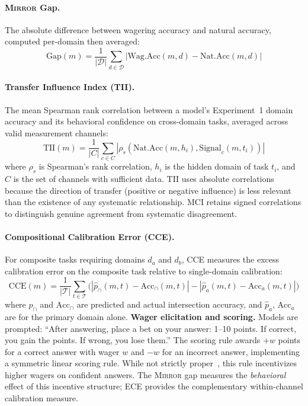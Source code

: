 \documentclass[10pt]{article}
\newcommand{\mirror}{\textsc{Mirror}}
\newcommand{\CCE}{CCE}
\newcommand{\TII}{TII}
\begin{document}
\paragraph{\mirror{} Gap.}
The absolute difference between wagering accuracy and natural accuracy, computed per-domain then averaged:
\begin{equation}
\text{Gap}(m) = \frac{1}{|\mathcal{D}|} \sum_{d \in \mathcal{D}} |\text{Wag.Acc}(m, d) - \text{Nat.Acc}(m, d)|
\end{equation}

\paragraph{Transfer Influence Index (\TII{}).}
The mean Spearman rank correlation between a model's Experiment~1 domain accuracy and its behavioral confidence on cross-domain tasks, averaged across valid measurement channels:
\begin{equation}
\text{TII}(m) = \frac{1}{|C|} \sum_{c \in C} |\rho_s(\text{Nat.Acc}(m, h_i), \text{Signal}_c(m, t_i))|
\end{equation}
where $\rho_s$ is Spearman's rank correlation, $h_i$ is the hidden domain of task $t_i$, and $C$ is the set of channels with sufficient data.
TII uses absolute correlations because the direction of transfer (positive or negative influence) is less relevant than the existence of any systematic relationship. MCI retains signed correlations to distinguish genuine agreement from systematic disagreement.

\paragraph{Compositional Calibration Error (\CCE{}).}
For composite tasks requiring domains $d_a$ and $d_b$, CCE measures the excess calibration error on the composite task relative to single-domain calibration:
\begin{equation}
\text{CCE}(m) = \frac{1}{|\mathcal{T}|} \sum_{t \in \mathcal{T}} \bigl(|\hat{p}_{\cap}(m,t) - \text{Acc}_{\cap}(m,t)| - |\hat{p}_{a}(m,t) - \text{Acc}_{a}(m,t)|\bigr)
\label{eq:cce}
\end{equation}
where $\hat{p}_{\cap}$ and $\text{Acc}_{\cap}$ are predicted and actual intersection accuracy, and $\hat{p}_a$, $\text{Acc}_a$ are for the primary domain alone.
\textbf{Wager elicitation and scoring.} Models are prompted: ``After answering, place a bet on your answer: 1--10 points. If correct, you gain the points. If wrong, you lose them.'' The scoring rule awards $+w$ points for a correct answer with wager $w$ and $-w$ for an incorrect answer, implementing a symmetric linear scoring rule. While not strictly proper~\citep{gneiting2007strictly}, this rule incentivizes higher wagers on confident answers. The \mirror{} gap measures the \textit{behavioral} effect of this incentive structure; ECE provides the complementary within-channel calibration measure.
\end{document}

